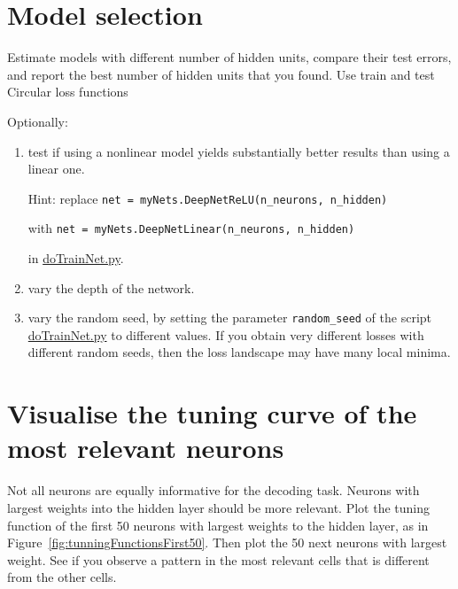 \documentclass[12pt]{article}
\begin{document}
\section{Model selection}

Estimate models with different number of hidden units, compare their test
errors, and report the best number of hidden units that you found. Use train and
test Circular loss functions

Optionally:

\begin{enumerate}

    \item test if using a nonlinear model yields substantially better results
        than using a linear one.

        Hint: replace \texttt{net =
        myNets.DeepNetReLU(n\_neurons, n\_hidden)}

        with \texttt{net = myNets.DeepNetLinear(n\_neurons, n\_hidden)}

        in
        \href{https://github.com/joacorapela/statNeuro2025/blob/master/worksheets/08_artificialNeuralNetworks/code/scripts/doTrainNet.py}{doTrainNet.py}.

    \item vary the depth of the network.

    \item vary the random seed, by setting the parameter \texttt{random\_seed}
        of the script
        \href{https://github.com/joacorapela/statNeuro2025/blob/master/worksheets/08_artificialNeuralNetworks/code/scripts/doTrainNet.py}{doTrainNet.py}
        to different values. If you obtain very different losses with different
        random seeds, then the loss landscape may have many local minima.


\end{enumerate}

\section{Visualise the tuning curve of the most relevant neurons}

Not all neurons are equally informative for the decoding task. Neurons with
largest weights into the hidden layer should be more relevant. Plot the tuning
function of the first 50 neurons with largest weights to the hidden layer, as
in Figure~\ref{fig:tunningFunctionsFirst50}. Then plot the 50 next neurons with largest weight. See if
you observe a pattern in the most relevant cells that is different from the
other cells.
\end{document}
